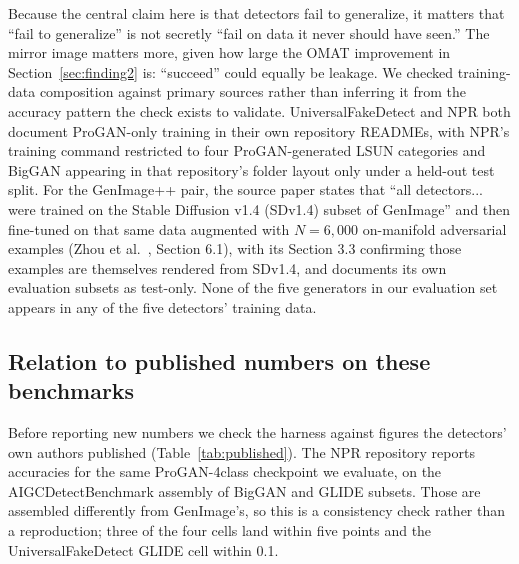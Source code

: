 \documentclass[3p,times,procedia]{elsarticle}
\begin{document}
Because the central claim here is that detectors fail to generalize, it
matters that ``fail to generalize'' is not secretly ``fail on data it
never should have seen.'' The mirror image matters more, given how large
the OMAT improvement in Section~\ref{sec:finding2} is: ``succeed'' could
equally be leakage. We checked training-data composition against primary
sources rather than inferring it from the accuracy pattern the check
exists to validate. UniversalFakeDetect and NPR both document ProGAN-only
training in their own repository READMEs, with NPR's training command
restricted to four ProGAN-generated LSUN categories and BigGAN appearing
in that repository's folder layout only under a held-out test split. For
the GenImage++ pair, the source paper states that ``all detectors... were
trained on the Stable Diffusion v1.4 (SDv1.4) subset of GenImage'' and
then fine-tuned on that same data augmented with $N=6{,}000$ on-manifold
adversarial examples (Zhou et al.~\cite{zhou2025omat}, Section 6.1), with
its Section 3.3 confirming those examples are themselves rendered from
SDv1.4, and documents its own evaluation subsets as test-only. None of the
five generators in our evaluation set appears in any of the five
detectors' training data.

\subsection{Relation to published numbers on these benchmarks}
\label{sec:methods-published}

Before reporting new numbers we check the harness against figures the
detectors' own authors published (Table~\ref{tab:published}). The NPR
repository reports accuracies for the same ProGAN-4class checkpoint we
evaluate, on the AIGCDetectBenchmark assembly of BigGAN and GLIDE subsets.
Those are assembled differently from GenImage's, so this is a consistency
check rather than a reproduction; three of the four cells land within five
points and the UniversalFakeDetect GLIDE cell within 0.1.
\end{document}
